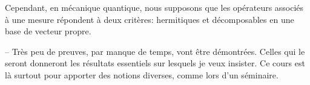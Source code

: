 Cependant, en mécanique quantique, nous supposons que les opérateurs associés à
une mesure répondent à deux critères: hermitiques et décomposables en une base
de vecteur propre.

-- Très peu de preuves, par manque de temps, vont être démontrées. Celles qui le
seront donneront les résultats essentiels sur lesquels je veux insister. Ce
cours est là surtout pour apporter des notions diverses, comme lors d'un
séminaire.

